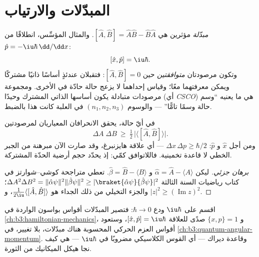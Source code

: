 \section{المبدّلات والارتياب}

\begin{definition}\label{def:b3:quantum-formalism:commutator}
\emph{مبدّلة} مؤثرين هي $[\hat A, \hat B] = \hat
A\hat B - \hat B\hat A$. والمثال المؤسِّس، انطلاقًا من $\hat p =
-\iu\hbar\,\dd/\dd x$:
\[
[\hat x, \hat p] = \iu\hbar .
\]
وتكون مرصودتان \emph{متوافقتين} حين $[\hat A, \hat B] = 0$:
فتقبلان عندئذٍ أساسًا ذاتيًا مشتركًا ويمكن معرفتهما معًا؛
وقياس إحداهما لا يزعج حالة حادّة في الأخرى. ومجموعة
مرصودات متبادلة يكون أساسها الذاتي المشترك وحيدًا (أي
\emph{CSCO}) هي ما يعنيه ``وسم حالة وسمًا تامًّا'' --- والوسوم
$(n_1, n_2, n_3)$ في العلبة كانت هذا بالضبط.
\end{definition}

\begin{theorem}\label{thm:b3:quantum-formalism:uncertainty}
في أيّ حالة، يحقق الانحرافان المعياريان لمرصودتين
\[
\Delta A\;\Delta B \ \ge\ \tfrac12\,\big|\langle[\hat A, \hat
B]\rangle\big| .
\]
ومن أجل $\hat x$ و $\hat p$: $\Delta x\,\Delta p \ge \hbar/2$ ---
أي علاقة هايزنبرغ، وقد صارت الآن مبرهنة من الجبر الخطي لا
قاعدة تخمينية. فاللاتوافق كمّي: إذ يحدّد حجم 
أرضية الحدّة المشتركة.
\end{theorem}

\begin{proof}[برهان جزئي]
ليكن $\hat\alpha = \hat A - \langle A\rangle$ و $\hat\beta = \hat B -
\langle B\rangle$. تعطي متراجحة كوشي--شوارتز في كتاب رياضيات
السنة الثالثة $\Delta A^2\Delta B^2 =
\|\hat\alpha\psi\|^2\|\hat\beta\psi\|^2 \ge
|\braket{\hat\alpha\psi}{\hat\beta\psi}|^2$؛ والجزء التخيلي من
ذلك الجداء هو $\tfrac1{2\iu}\langle[\hat A, \hat B]\rangle$، و
$|z|^2 \ge (\operatorname{Im}z)^2$.
\end{proof}

\begin{remark}\label{rem:b3:quantum-formalism:poisson}
اقسم على $\iu\hbar$ ودع $\hbar \to 0$: فتصير المبدّلات
أقواس بواسون الواردة في \cref{ch:b3:hamiltonian-mechanics}، و $\{x, p\} =
1$ صدًى للعلاقة $[\hat x, \hat p] = \iu\hbar$، وستعود أقواس العزم
الحركي المحسوبة هناك مبدّلات، بلا تغيير، في
\cref{ch:b3:quantum-angular-momentum}. وقاعدة ديراك --- أي القوس
الكلاسيكي مضروبًا في $\iu\hbar$ --- هي كيف نجا هيكل الميكانيك
من الثورة.
\end{remark}

